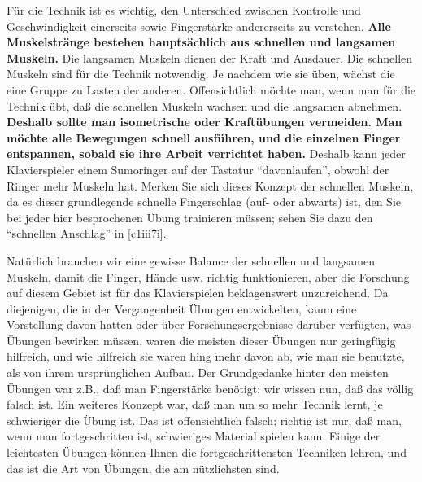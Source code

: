 Für die Technik ist es wichtig, den Unterschied zwischen Kontrolle und Geschwindigkeit einerseits sowie Fingerstärke andererseits zu verstehen.
\textbf{Alle Muskelstränge bestehen hauptsächlich aus schnellen und langsamen Muskeln.}
Die langsamen Muskeln dienen der Kraft und Ausdauer.
Die schnellen Muskeln sind für die Technik notwendig.
Je nachdem wie sie üben, wächst die eine Gruppe zu Lasten der anderen.
Offensichtlich möchte man, wenn man für die Technik übt, daß die schnellen Muskeln wachsen und die langsamen abnehmen.
\textbf{Deshalb sollte man isometrische oder Kraftübungen vermeiden.
Man möchte alle Bewegungen schnell ausführen, und die einzelnen Finger entspannen, sobald sie ihre Arbeit verrichtet haben.}
Deshalb kann jeder Klavierspieler einem Sumoringer auf der Tastatur \enquote{davonlaufen}, obwohl der Ringer mehr Muskeln hat.
Merken Sie sich dieses Konzept der schnellen Muskeln, da es dieser grundlegende schnelle Fingerschlag (auf- oder abwärts) ist, den Sie bei jeder hier besprochenen Übung trainieren müssen; sehen Sie dazu den \enquote{\hyperref[c1iii7i]{schnellen Anschlag}} in \autoref{c1iii7i}.

Natürlich brauchen wir eine gewisse Balance der schnellen und langsamen Muskeln, damit die Finger, Hände usw. richtig funktionieren, aber die Forschung auf diesem Gebiet ist für das Klavierspielen beklagenswert unzureichend.
Da diejenigen, die in der Vergangenheit Übungen entwickelten, kaum eine Vorstellung davon hatten oder über Forschungsergebnisse darüber verfügten, was Übungen bewirken müssen, waren die meisten dieser Übungen nur geringfügig hilfreich, und wie hilfreich sie waren hing mehr davon ab, wie man sie benutzte, als von ihrem ursprünglichen Aufbau.
Der Grundgedanke hinter den meisten Übungen war z.B., daß man Fingerstärke benötigt; wir wissen nun, daß das völlig falsch ist.
Ein weiteres Konzept war, daß man um so mehr Technik lernt, je schwieriger die Übung ist.
Das ist offensichtlich falsch; richtig ist nur, daß man, wenn man fortgeschritten ist, schwieriges Material spielen kann.
Einige der leichtesten Übungen können Ihnen die fortgeschrittensten Techniken lehren, und das ist die Art von Übungen, die am nützlichsten sind.



